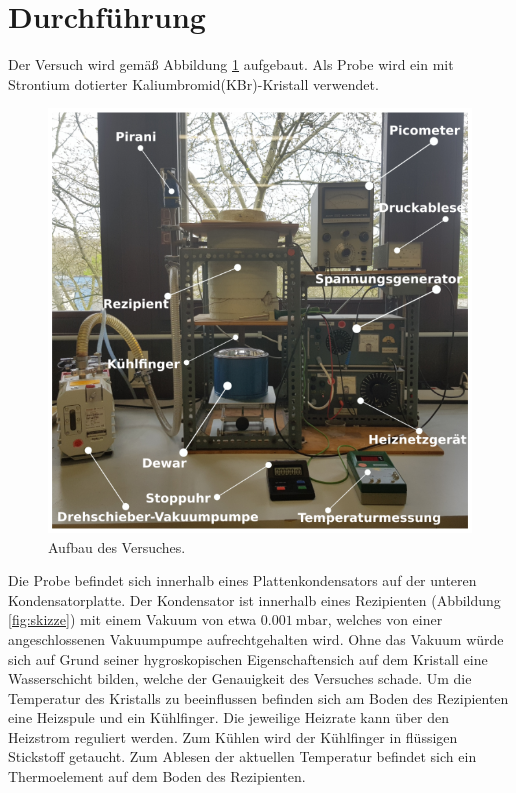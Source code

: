 \section{Durchführung}
\label{sec:Durchführung}

Der Versuch wird gemäß Abbildung \ref{fig:aufbau} aufgebaut. Als Probe wird ein mit Strontium dotierter Kaliumbromid(KBr)-Kristall verwendet.

\begin{figure}
    \centering
    \includegraphics[width=\textwidth]{Bilder/Aufbau.PNG}
    \caption{Aufbau des Versuches.}
    \label{fig:aufbau}
\end{figure}

Die Probe befindet sich innerhalb eines Plattenkondensators auf der unteren Kondensatorplatte. Der Kondensator ist innerhalb eines Rezipienten (Abbildung \ref{fig:skizze}) mit einem Vakuum von etwa $\SI{0.001}{\milli\bar}$, welches von einer angeschlossenen Vakuumpumpe aufrechtgehalten wird. Ohne das Vakuum würde sich auf Grund seiner hygroskopischen Eigenschaftensich auf dem Kristall eine Wasserschicht bilden, welche der Genauigkeit des Versuches schade.
Um die Temperatur des Kristalls zu beeinflussen befinden sich am Boden des Rezipienten eine Heizspule und ein Kühlfinger. Die jeweilige Heizrate kann über den Heizstrom reguliert werden. Zum Kühlen wird der Kühlfinger in flüssigen Stickstoff getaucht. Zum Ablesen der aktuellen Temperatur befindet sich ein Thermoelement auf dem Boden des Rezipienten. 


